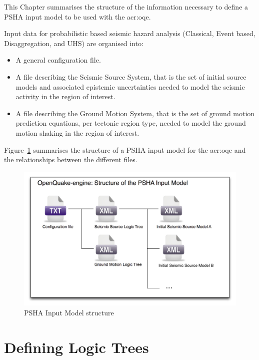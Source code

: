 This Chapter summarises the structure of the information necessary to define
a PSHA input model to be used with the \glsdesc{acr:oqe}.

Input data for probabilistic based seismic hazard analysis (Classical, Event
based, Disaggregation, and UHS) are organised into:

\begin{itemize}

	\item A general configuration file.

    \item A file describing the Seismic Source System, that is the set of
	initial source models and associated epistemic uncertainties needed to
	model the seismic activity in the region of interest.

    \item A file describing the Ground Motion System, that is the set of
	ground motion prediction equations, per tectonic region type, needed to
	model the ground motion shaking in the region of interest.

\end{itemize}

Figure~\ref{fig:psha_input} summarises the structure of a PSHA input model
for the \glsdesc{acr:oqe} and the relationships between the different files.

\begin{figure}[!ht]
\centering
\includegraphics[width=14cm]{figures/hazard/psha_input_structure.pdf}
\caption{PSHA Input Model structure}
\label{fig:psha_input}
\end{figure}


\section{Defining Logic Trees}

\label{sec:hazard_logic_trees}

